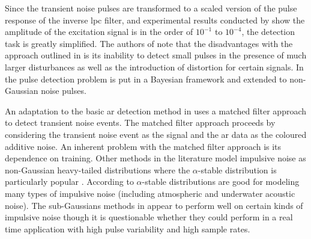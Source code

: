 Since the transient noise pulses are transformed to a scaled version of the pulse response of the inverse \gls{lpc} filter, and experimental results conducted by \cite{Vaseghi1990} show the amplitude of the excitation signal is in the order of $10^{-1}$ to $10^{-4}$, the detection task is greatly simplified. The authors of \cite{Godsill1998} note that the disadvantages with the approach outlined in \cite{Vaseghi1990} is its inability to detect small pulses in the presence of much larger disturbances as well as the introduction of distortion for certain signals. In \cite{Godsill1998} the pulse detection problem is put in a Bayesian framework and extended to non-Gaussian noise pulses.

An adaptation to the basic \gls{ar} detection method in \cite{Vaseghi1988} uses a matched filter approach to detect transient noise events. The matched filter approach proceeds by considering the transient noise event as the signal and the \gls{ar} data as the coloured additive noise\cite{Godsill1998book}. An inherent problem with the matched filter approach is its dependence on training. Other methods in the literature model impulsive noise as non-Gaussian heavy-tailed distributions where the $\alpha$-stable distribution is particularly popular \cite{Tsihrintzis1997}\cite{Coates2002}. According to \cite{Nikias1995} $\alpha$-stable distributions are good for modeling many types of impulsive noise (including atmospheric and underwater acoustic noise). The sub-Gaussians methods in \cite{Tsihrintzis1997}\cite{Coates2002} appear to perform well on certain kinds of impulsive noise though it is questionable whether they could perform in a real time application with high pulse variability and high sample rates.

